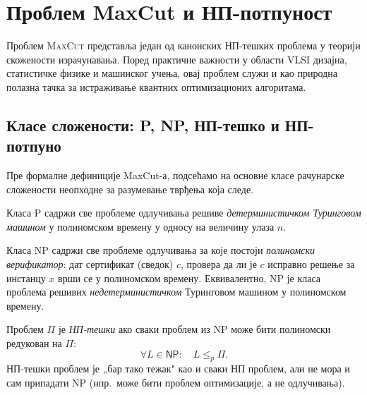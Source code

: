 \section{Проблем MaxCut и НП-потпуност}
\label{sec:maxcut}

Проблем \textsc{MaxCut} представља један од канонских НП-тешких
проблема у теорији скожености израчунавања. Поред практичне важности
у области VLSI дизајна, статистичке физике и машинског учења,
овај проблем служи и као природна полазна тачка за истраживање
квантних оптимизационих алгоритама.

\subsection{Класе сложености: \textsf{P}, \textsf{NP}, НП-тешко и НП-потпуно}

Пре формалне дефиниције MaxCut-а, подсећамо на основне класе
рачунарске сложености неопходне за разумевање тврђења која следе.

\begin{definition}
Класа \textsf{P} садржи све проблеме одлучивања решиве
\emph{детерминистичком Туринговом машином} у полиномском времену
у односу на величину улаза $n$.
\end{definition}

\begin{definition}
Класа \textsf{NP} садржи све проблеме одлучивања за које постоји
\emph{полиномски верификатор}: дат сертификат (сведок) $c$,
провера да ли је $c$ исправно решење за инстанцу $x$ врши се у
полиномском времену.
Еквивалентно, \textsf{NP} је класа проблема решивих
\emph{недетерминистичком} Туринговом машином у полиномском времену.
\end{definition}

\begin{definition}
Проблем $\Pi$ је \emph{НП-тешки} ако сваки проблем из \textsf{NP}
може бити полиномски редукован на $\Pi$:
\[
  \forall L \in \textsf{NP}: \quad L \leq_p \Pi.
\]
НП-тешки проблем је „бар тако тежак" као и сваки НП проблем,
али не мора и сам припадати \textsf{NP}
(нпр.\ може бити проблем оптимизације, а не одлучивања).
\end{definition}

